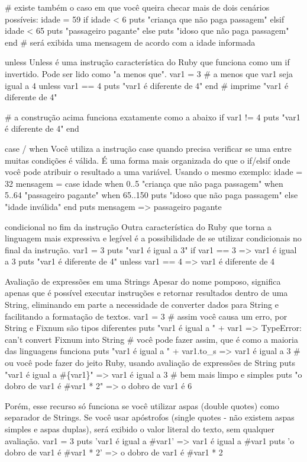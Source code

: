 \documentclass[12pt]{book} %
\begin{document}
\# existe também o caso em que você queira checar mais de dois cenários possíveis:
idade = 59
if idade < 6
  puts "criança que não paga passagem"
elsif idade < 65
  puts "passageiro pagante"
else
  puts "idoso que não paga passagem"
end
\# será exibida uma mensagem de acordo com a idade informada

unless
Unless é uma instrução característica do Ruby que funciona como um if invertido. Pode ser lido como "a menos que".
var1 = 3
\# a menos que var1 seja igual a 4
unless var1 == 4
  puts "var1 é diferente de 4"
end
\# imprime "var1 é diferente de 4"

\# a construção acima funciona exatamente como a abaixo
if var1 != 4
  puts "var1 é diferente de 4"
end

case / when
Você utiliza a instrução case quando precisa verificar se uma entre muitas condições é válida. É uma forma mais organizada do que o if/elsif onde você pode atribuir o resultado a uma variável.
Usando o mesmo exemplo:
idade = 32
mensagem = case idade
  when 0..5
    "criança que não paga passagem"
  when 5..64
    "passageiro pagante"
  when 65..150
    puts "idoso que não paga passagem"
  else
    "idade inválida"
  end
puts mensagem
=> passageiro pagante

condicional no fim da instrução
Outra característica do Ruby que torna a linguagem mais expressiva e legível é a possibilidade de se utilizar condicionais no final da instrução.
var1 = 3
puts "var1 é igual a 3" if var1 == 3
=> var1 é igual a 3
puts "var1 é diferente de 4" unless var1 == 4
=> var1 é diferente de 4

Avaliação de expressões em uma Strings
Apesar do nome pomposo, significa apenas que é possível executar instruções e retornar resultados dentro de uma String, eliminando em parte a necessidade de converter dados para String e facilitando a formatação de textos.
var1 = 3
\# assim você causa um erro, por String e Fixnum são tipos diferentes
puts "var1 é igual a " + var1
=> TypeError: can't convert Fixnum into String
\# você pode fazer assim, que é como a maioria das linguagens funciona
puts "var1 é igual a " + var1.to\_s
=> var1 é igual a 3
\# ou você pode fazer do jeito Ruby, usando avaliação de expressões de String
puts "var1 é igual a \#\{var1\}"
=> var1 é igual a 3
\# bem mais limpo e simples
puts "o dobro de var1 é \#{var1 * 2}"
=> o dobro de var1 é 6

Porém, esse recurso só funciona se você utilizar aspas (double quotes) como separador de Strings. Se você usar apóstrofos (single quotes - não existem aspas simples e aspas duplas), será exibido o valor literal do texto, sem qualquer avaliação.
var1 = 3
puts 'var1 é igual a \#{var1}'
=> var1 é igual a \#{var1}
puts 'o dobro de var1 é \#{var1 * 2}'
=> o dobro de var1 é \#{var1 * 2}
\end{document}
